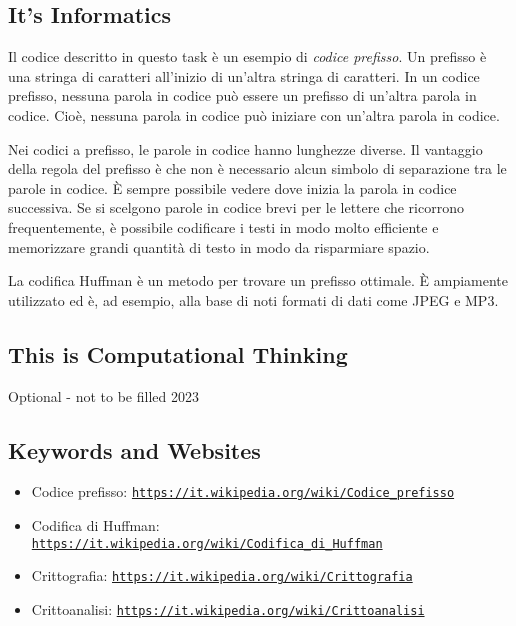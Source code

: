 \documentclass[a4paper,11pt]{report}
\newcommand{\BrochureUrlText}[1]{\texttt{#1}}
\begin{document}
\subsection*{It’s Informatics}

Il codice descritto in questo task è un esempio di \emph{codice prefisso}. Un prefisso è una stringa di caratteri all’inizio di un’altra stringa di caratteri. In un codice prefisso, nessuna parola in codice può essere un prefisso di un’altra parola in codice. Cioè, nessuna parola in codice può iniziare con un’altra parola in codice.

Nei codici a prefisso, le parole in codice hanno lunghezze diverse. Il vantaggio della regola del prefisso è che non è necessario alcun simbolo di separazione tra le parole in codice. È sempre possibile vedere dove inizia la parola in codice successiva. Se si scelgono parole in codice brevi per le lettere che ricorrono frequentemente, è possibile codificare i testi in modo molto efficiente e memorizzare grandi quantità di testo in modo da risparmiare spazio.

La codifica Huffman è un metodo per trovare un prefisso ottimale. È ampiamente utilizzato ed è, ad esempio, alla base di noti formati di dati come JPEG e MP3.


\subsection*{This is Computational Thinking}

Optional - not to be filled 2023

{\raggedright

\subsection*{Keywords and Websites}

\begin{itemize}
  \item Codice prefisso: \href{https://it.wikipedia.org/wiki/Codice_prefisso}{\BrochureUrlText{https://it.wikipedia.org/wiki/Codice\_prefisso}}
  \item Codifica di Huffman: \href{https://it.wikipedia.org/wiki/Codifica_di_Huffman}{\BrochureUrlText{https://it.wikipedia.org/wiki/Codifica\_di\_Huffman}}
  \item Crittografia: \href{https://it.wikipedia.org/wiki/Crittografia}{\BrochureUrlText{https://it.wikipedia.org/wiki/Crittografia}}
  \item Crittoanalisi: \href{https://it.wikipedia.org/wiki/Crittoanalisi}{\BrochureUrlText{https://it.wikipedia.org/wiki/Crittoanalisi}}
\end{itemize}


}
\end{document}
